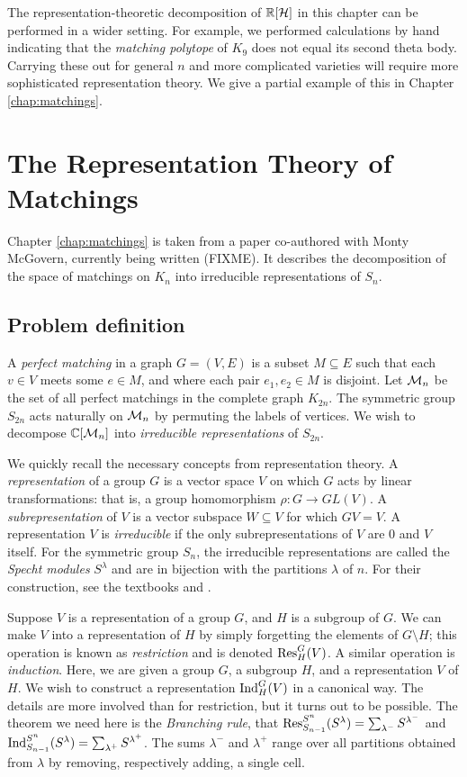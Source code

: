 The representation-theoretic decomposition of $\mathbb{R}[\mathcal{H}]$ in this chapter can be performed in a wider setting.
For example, we performed calculations by hand indicating that the {\em matching polytope} of $K_9$ does not equal its second theta body.
Carrying these out for general $n$ and more complicated varieties will require more sophisticated representation theory.
We give a partial example of this in Chapter \ref{chap:matchings}.


\section{The Representation Theory of Matchings}
Chapter \ref{chap:matchings} is taken from a paper co-authored with Monty McGovern, currently being written (FIXME).
It describes the decomposition of the space of matchings on $K_n$ into irreducible representations of $S_n$.

\subsection{Problem definition}
A {\em perfect matching} in a graph $G=(V,E)$ is a subset $M \subseteq E$ such that each $v \in V$ meets some $e \in M$, and where each pair $e_1,e_2 \in M$ is disjoint.
Let $\mathcal{M}_{n}$ be the set of all perfect matchings in the complete graph $K_{2n}$.
The symmetric group $S_{2n}$ acts naturally on $\mathcal{M}_{n}$ by permuting the labels of vertices.
We wish to decompose $\mathbb{C}[\mathcal{M}_{n}]$ into {\em irreducible representations} of $S_{2n}$.

We quickly recall the necessary concepts from representation theory.
A {\em representation} of a group $G$ is a vector space $V$ on which $G$ acts by linear transformations: that is, a group homomorphism $\rho: G \to GL(V)$.
A {\em subrepresentation} of $V$ is a vector subspace $W \subseteq V$ for which $GV = V$.
A representation $V$ is {\em irreducible} if the only subrepresentations of $V$ are 0 and $V$ itself.
For the symmetric group $S_n$, the irreducible representations are called the {\em Specht modules} $S^\lambda$ and are in bijection with the partitions $\lambda$ of $n$.
For their construction, see the textbooks \cite{Sagan} and \cite{Fulton}.

Suppose $V$ is a representation of a group $G$, and $H$ is a subgroup of $G$.
We can make $V$ into a representation of $H$ by simply forgetting the elements of $G \setminus H$; this operation is known as {\em restriction} and is denoted $\textup{Res}^G_H(V)$.
A similar operation is {\em induction}.
Here, we are given a group $G$, a subgroup $H$, and a representation $V$ of $H$.
We wish to construct a representation $\textup{Ind}_H^G(V)$ in a canonical way.
The details are more involved than for restriction, but it turns out to be possible.
The theorem we need here is the {\em Branching rule}, that $\textup{Res}_{S_{n-1}}^{S^n}(S^\lambda) = \sum_{\lambda^-} S^{\lambda^-}$ and $\textup{Ind}_{S_{n-1}}^{S^n}(S^\lambda) = \sum_{\lambda^+} S^{\lambda^+}$.
The sums $\lambda^-$ and $\lambda^+$ range over all partitions obtained from $\lambda$ by removing, respectively adding, a single cell.

